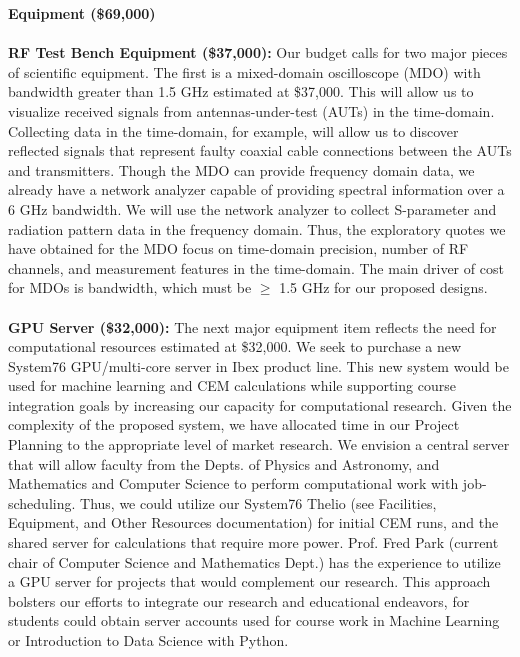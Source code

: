 \documentclass[11pt]{amsart}
\begin{document}
\noindent
\textbf{Equipment (\$69,000)} \\ \\
\noindent
\textbf{RF Test Bench Equipment (\$37,000):} Our budget calls for two major pieces of scientific equipment. The first is a mixed-domain oscilloscope (MDO) with bandwidth greater than 1.5 GHz estimated at \$37,000. This will allow us to visualize received signals from antennas-under-test (AUTs) in the time-domain. Collecting data in the time-domain, for example, will allow us to discover reflected signals that represent faulty coaxial cable connections between the AUTs and transmitters. Though the MDO can provide frequency domain data, we already have a network analyzer capable of providing spectral information over a 6 GHz bandwidth. We will use the network analyzer to collect S-parameter and radiation pattern data in the frequency domain. Thus, the exploratory quotes we have obtained for the MDO focus on time-domain precision, number of RF channels, and measurement features in the time-domain. The main driver of cost for MDOs is bandwidth, which must be $\geq$ 1.5 GHz for our proposed designs. \\ \\
\noindent
\textbf{GPU Server (\$32,000):} The next major equipment item reflects the need for computational resources estimated at \$32,000.  We seek to purchase a new System76 GPU/multi-core server in Ibex product line. This new system would be used for machine learning and CEM calculations while supporting course integration goals by increasing our capacity for computational research. Given the complexity of the proposed system, we have allocated time in our Project Planning to the appropriate level of market research.  We envision a central server that will allow faculty from the Depts. of Physics and Astronomy, and Mathematics and Computer Science to perform computational work with job-scheduling. Thus, we could utilize our System76 Thelio (see Facilities, Equipment, and Other Resources documentation) for initial CEM runs, and the shared server for calculations that require more power. Prof. Fred Park (current chair of Computer Science and Mathematics Dept.) has the experience to utilize a GPU server for projects that would complement our research. This approach bolsters our efforts to integrate our research and educational endeavors, for students could obtain server accounts used for course work in Machine Learning or Introduction to Data Science with Python. \\
\end{document}
